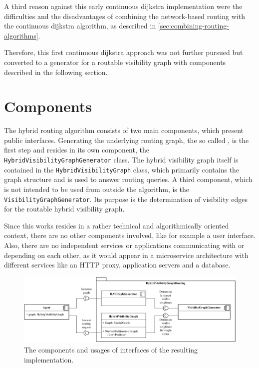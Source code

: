 		A third reason against this early continuous dijkstra implementation were the difficulties and the disadvantages of combining the network-based routing with the continuous dijkstra algorithm, as described in \cref{sec:combining-routing-algorithms}.
		
		Therefore, this first continuous dijkstra approach was not further pursued but converted to a generator for a routable visibility graph with components described in the following section.
	
\section{Components}
\label{sec:components}

	The hybrid routing algorithm consists of two main components, which present public interfaces.
	Generating the underlying routing graph, the so called , is the first step and resides in its own component, the \texttt{HybridVisibilityGraphGenerator} class.
	The hybrid visibility graph itself is contained in the \texttt{HybridVisibilityGraph} class, which primarily contains the graph structure and is used to answer routing queries.
	A third component, which is not intended to be used from outside the algorithm, is the \texttt{VisibilityGraphGenerator}.
	Its purpose is the determination of visibility edges for the routable hybrid visibility graph.
	
	Since this works resides in a rather technical and algorithmically oriented context, there are no other components involved, like for example a user interface.
	Also, there are no independent services or applications communicating with or depending on each other, as it would appear in a microservice architecture with different services like an HTTP proxy, application servers and a database.
	
	\begin{figure}[h]
		\begin{figcenter}
			\includegraphics[width=\textwidth]{images/components.pdf}
		\end{figcenter}
		\caption{The components and usages of interfaces of the resulting implementation.}
		\label{fig:components}
	\end{figure}
	
